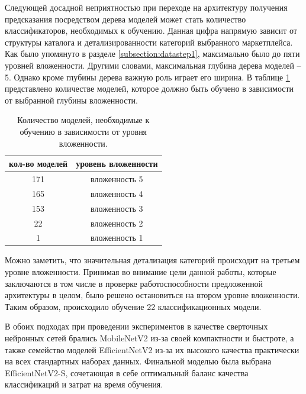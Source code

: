 \documentclass[a4paper,12pt]{extarticle}
\begin{document}
Следующей досадной неприятностью при переходе на архитектуру получения предсказания посредством дерева моделей может стать количество классификаторов, необходимых к обучению. Данная цифра напрямую зависит от структуры каталога и детализированности категорий выбранного маркетплейса. Как было упомянуто в разделе \ref{subsection:datastep1}, максимально было до пяти уровней вложенности. Другими словами, максимальная глубина дерева моделей – 5. Однако кроме глубины дерева важную роль играет его ширина. В таблице \ref{table:amount-models} представлено количестве моделей, которое должно быть обучено в зависимости от выбранной глубины вложенности.

\begin{table}[ht]
	\caption{Количество моделей, необходимые к обучению в зависимости от уровня вложенности.}
	\label{table:amount-models}
	\footnotesize
	\centering
	\begin{tabular}{cc}
		\toprule
		\multicolumn{1}{c}{кол-во моделей} & \multicolumn{1}{c}{уровень вложенности}\\
		\midrule
		171 & вложенность 5\\
		165 & вложенность 4\\
		153 & вложенность 3\\
		22  & вложенность 2\\
		1   & вложенность 1\\
		\bottomrule
	\end{tabular}
\end{table}

Можно заметить, что значительная детализация категорий происходит на третьем уровне вложенности. Принимая во внимание цели данной работы, которые заключаются в том числе в проверке работоспособности предложенной архитектуры в целом, было решено остановиться на втором уровне вложенности. Таким образом, происходило обучение 22 классификационных модели.

В обоих подходах при проведении экспериментов в качестве сверточных нейронных сетей брались MobileNetV2 из-за своей компактности и быстроте, а также семейство моделей EfficientNetV2 из-за их высокого качества практически на всех стандартных наборах данных. Финальной моделью была выбрана EfficientNetV2-S, сочетающая в себе оптимальный баланс качества классификаций и затрат на время обучения.
\end{document}
